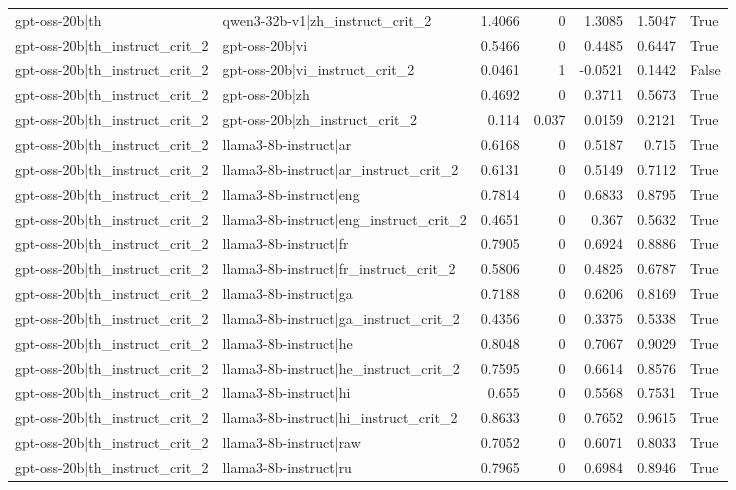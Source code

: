 \begin{table}
\begin{tabular}{l l r r r r l}
gpt-oss-20b|th & qwen3-32b-v1|zh_instruct_crit_2 & 1.4066 & 0 & 1.3085 & 1.5047 & True \\
gpt-oss-20b|th_instruct_crit_2 & gpt-oss-20b|vi & 0.5466 & 0 & 0.4485 & 0.6447 & True \\
gpt-oss-20b|th_instruct_crit_2 & gpt-oss-20b|vi_instruct_crit_2 & 0.0461 & 1 & -0.0521 & 0.1442 & False \\
gpt-oss-20b|th_instruct_crit_2 & gpt-oss-20b|zh & 0.4692 & 0 & 0.3711 & 0.5673 & True \\
gpt-oss-20b|th_instruct_crit_2 & gpt-oss-20b|zh_instruct_crit_2 & 0.114 & 0.037 & 0.0159 & 0.2121 & True \\
gpt-oss-20b|th_instruct_crit_2 & llama3-8b-instruct|ar & 0.6168 & 0 & 0.5187 & 0.715 & True \\
gpt-oss-20b|th_instruct_crit_2 & llama3-8b-instruct|ar_instruct_crit_2 & 0.6131 & 0 & 0.5149 & 0.7112 & True \\
gpt-oss-20b|th_instruct_crit_2 & llama3-8b-instruct|eng & 0.7814 & 0 & 0.6833 & 0.8795 & True \\
gpt-oss-20b|th_instruct_crit_2 & llama3-8b-instruct|eng_instruct_crit_2 & 0.4651 & 0 & 0.367 & 0.5632 & True \\
gpt-oss-20b|th_instruct_crit_2 & llama3-8b-instruct|fr & 0.7905 & 0 & 0.6924 & 0.8886 & True \\
gpt-oss-20b|th_instruct_crit_2 & llama3-8b-instruct|fr_instruct_crit_2 & 0.5806 & 0 & 0.4825 & 0.6787 & True \\
gpt-oss-20b|th_instruct_crit_2 & llama3-8b-instruct|ga & 0.7188 & 0 & 0.6206 & 0.8169 & True \\
gpt-oss-20b|th_instruct_crit_2 & llama3-8b-instruct|ga_instruct_crit_2 & 0.4356 & 0 & 0.3375 & 0.5338 & True \\
gpt-oss-20b|th_instruct_crit_2 & llama3-8b-instruct|he & 0.8048 & 0 & 0.7067 & 0.9029 & True \\
gpt-oss-20b|th_instruct_crit_2 & llama3-8b-instruct|he_instruct_crit_2 & 0.7595 & 0 & 0.6614 & 0.8576 & True \\
gpt-oss-20b|th_instruct_crit_2 & llama3-8b-instruct|hi & 0.655 & 0 & 0.5568 & 0.7531 & True \\
gpt-oss-20b|th_instruct_crit_2 & llama3-8b-instruct|hi_instruct_crit_2 & 0.8633 & 0 & 0.7652 & 0.9615 & True \\
gpt-oss-20b|th_instruct_crit_2 & llama3-8b-instruct|raw & 0.7052 & 0 & 0.6071 & 0.8033 & True \\
gpt-oss-20b|th_instruct_crit_2 & llama3-8b-instruct|ru & 0.7965 & 0 & 0.6984 & 0.8946 & True \\

\end{tabular}
\end{table}
